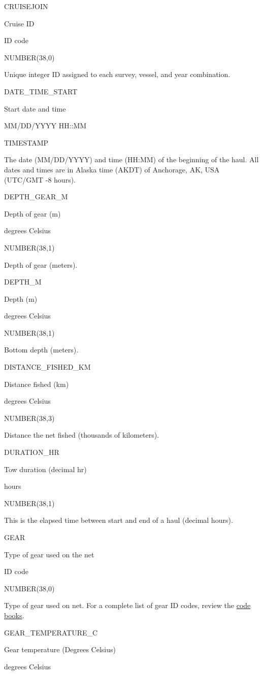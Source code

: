\documentclass[
  letterpaper,
  oneside,
  open=any]{scrbook}
\begin{document}
CRUISEJOIN

Cruise ID

ID code

NUMBER(38,0)

Unique integer ID assigned to each survey, vessel, and year combination.

DATE\_TIME\_START

Start date and time

MM/DD/YYYY HH::MM

TIMESTAMP

The date (MM/DD/YYYY) and time (HH:MM) of the beginning of the haul. All
dates and times are in Alaska time (AKDT) of Anchorage, AK, USA (UTC/GMT
-8 hours).

DEPTH\_GEAR\_M

Depth of gear (m)

degrees Celsius

NUMBER(38,1)

Depth of gear (meters).

DEPTH\_M

Depth (m)

degrees Celsius

NUMBER(38,1)

Bottom depth (meters).

DISTANCE\_FISHED\_KM

Distance fished (km)

degrees Celsius

NUMBER(38,3)

Distance the net fished (thousands of kilometers).

DURATION\_HR

Tow duration (decimal hr)

hours

NUMBER(38,1)

This is the elapsed time between start and end of a haul (decimal
hours).

GEAR

Type of gear used on the net

ID code

NUMBER(38,0)

Type of gear used on net. For a complete list of gear ID codes, review
the
\href{https://www.fisheries.noaa.gov/resource/document/groundfish-survey-species-code-manual-and-data-codes-manual}{code
books}.

GEAR\_TEMPERATURE\_C

Gear temperature (Degrees Celsius)

degrees Celsius
\end{document}
